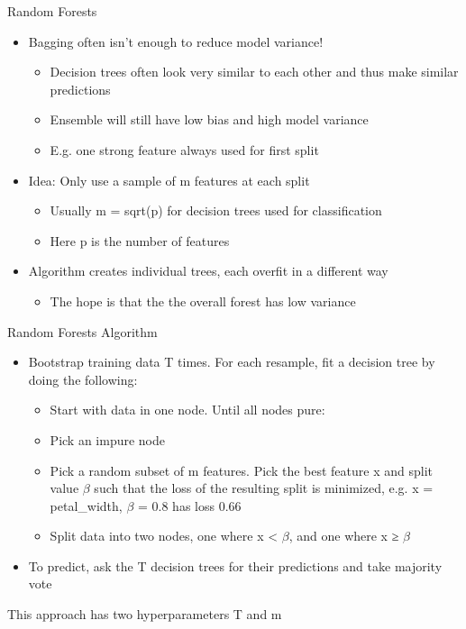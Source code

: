 \documentclass[aspectratio=169]{../latex_main/tntbeamer}  %
\begin{document}
	
	\begin{frame}{Random Forests}
	    \begin{itemize}
	        \item Bagging often isn’t enough to reduce model variance!
	        \begin{itemize}
	            \item Decision trees often look very similar to each other and thus make similar predictions
	            \item Ensemble will still have low bias and high model variance
	            \item E.g. one strong feature always used for first split
	        \end{itemize}
	        \item Idea: Only use a sample of m features at each split
	        \begin{itemize}
	            \item Usually m = sqrt(p) for decision trees used for classification
	            \item Here p is the number of features
	        \end{itemize}
	        \item Algorithm creates individual trees, each overfit in a different way
	        \begin{itemize}
	            \item The hope is that the the overall forest has low variance
	        \end{itemize}
	    \end{itemize}
	\end{frame}
	
	\begin{frame}{Random Forests Algorithm}
	    \begin{itemize}
	        \item Bootstrap training data T times. For each resample, fit a decision tree by doing the following:
	        \begin{itemize}
	            \item Start with data in one node. Until all nodes pure:
	            \item Pick an impure node
	            \item Pick a random subset of m features. Pick the best feature x and split value $\beta$ such that the loss of the resulting split is minimized, e.g. x = petal\_width, $\beta$ = 0.8 has loss 0.66
	            \item Split data into two nodes, one where x < $\beta$, and one where x ≥ $\beta$
	        \end{itemize}
	        \item To predict, ask the T decision trees for their predictions and take majority vote
	    \end{itemize}
	    This approach has two hyperparameters T and m
	\end{frame}
	
\end{document}
